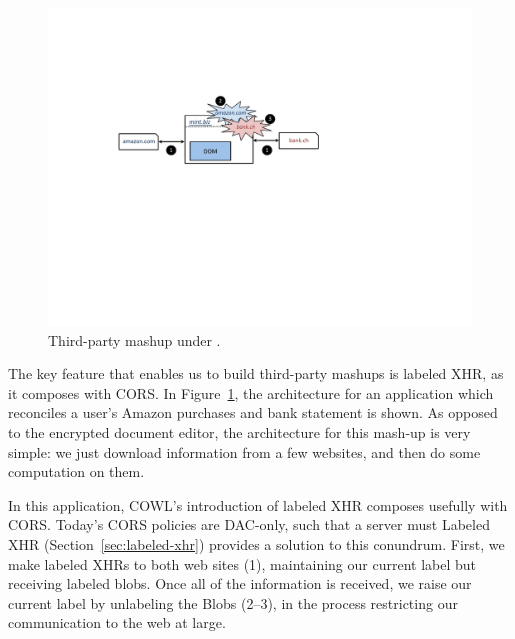 \begin{figure}
\centerline{\includegraphics[width=\columnwidth]{mashup}}
\caption{\label{fig:mashup} Third-party mashup under \sys{}.}
\end{figure}
The key feature that enables us to build third-party mashups is
labeled XHR, as it composes with CORS.  In Figure~\ref{fig:mashup},
the architecture for an application which reconciles a user's Amazon
purchases and bank statement is shown.  As opposed to the encrypted
document editor, the architecture for this mash-up is very simple: we
just download information from a few websites, and then do some
computation on them.

In this application, COWL's introduction of labeled XHR composes usefully with
CORS. Today's CORS policies are DAC-only, such that a server must
Labeled XHR (Section~\ref{sec:labeled-xhr}) provides a solution to
this conundrum.  First, we make labeled XHRs to both web sites (1),
maintaining our current label but receiving labeled blobs.  Once all of
the information is received, we raise our current label by unlabeling
the Blobs (2--3), in the process restricting our communication to the
web at large.


